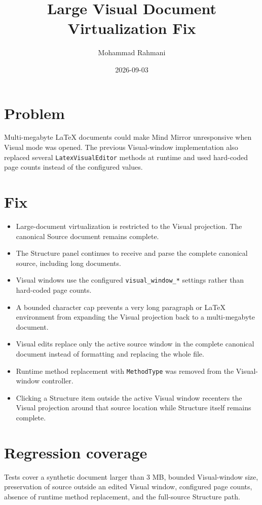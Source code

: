 \documentclass[a4paper]{article}
\title{Large Visual Document Virtualization Fix}
\date{2026-09-03}
\author{Mohammad Rahmani}
\begin{document}
   \maketitle

   \section{Problem}
   Multi-megabyte LaTeX documents could make Mind Mirror unresponsive when Visual mode was opened. The previous Visual-window implementation also replaced several \texttt{LatexVisualEditor} methods at runtime and used hard-coded page counts instead of the configured values.

   \section{Fix}
   \begin{itemize}
      \item Large-document virtualization is restricted to the Visual projection. The canonical Source document remains complete.
      \item The Structure panel continues to receive and parse the complete canonical source, including long documents.
      \item Visual windows use the configured \texttt{visual\_window\_*} settings rather than hard-coded page counts.
      \item A bounded character cap prevents a very long paragraph or LaTeX environment from expanding the Visual projection back to a multi-megabyte document.
      \item Visual edits replace only the active source window in the complete canonical document instead of formatting and replacing the whole file.
      \item Runtime method replacement with \texttt{MethodType} was removed from the Visual-window controller.
      \item Clicking a Structure item outside the active Visual window recenters the Visual projection around that source location while Structure itself remains complete.
   \end{itemize}

   \section{Regression coverage}
   Tests cover a synthetic document larger than 3 MB, bounded Visual-window size, preservation of source outside an edited Visual window, configured page counts, absence of runtime method replacement, and the full-source Structure path.

   
   
\end{document}
